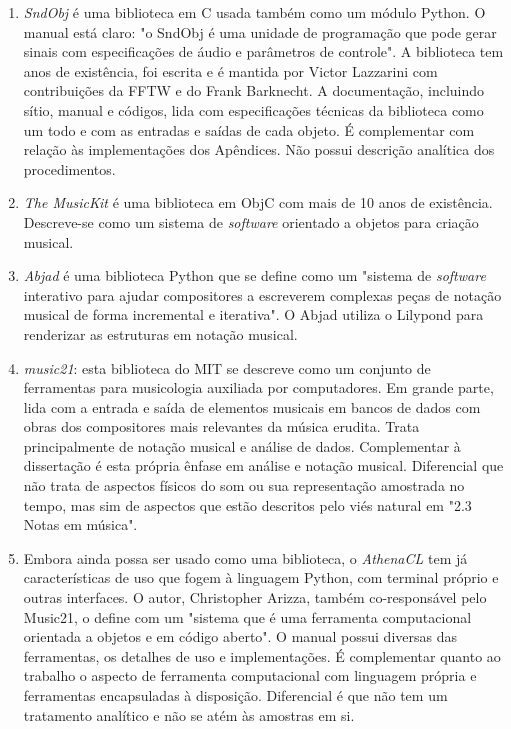 \begin{enumerate}
    \item \emph{SndObj} é uma biblioteca em C usada também como um módulo Python. O manual está claro: "o SndObj é uma unidade de programação que pode gerar sinais com especificações de áudio e parâmetros de controle". A biblioteca tem anos de existência, foi escrita e é mantida por Victor Lazzarini com contribuições da FFTW e do Frank Barknecht. A documentação, incluindo sítio, manual e códigos, lida com especificações técnicas da biblioteca como um todo e com as entradas e saídas de cada objeto. É complementar com relação às implementações dos Apêndices. Não possui descrição analítica dos procedimentos.
    \item \emph{The MusicKit} é uma biblioteca em ObjC com mais de 10 anos de existência. Descreve-se como um sistema de \emph{software} orientado a objetos para criação musical. 
    \item \emph{Abjad} é uma biblioteca Python que se define como um "sistema de \emph{software} interativo para ajudar compositores a escreverem complexas peças de notação musical de forma incremental e iterativa". O Abjad utiliza o Lilypond para renderizar as estruturas em notação musical.
    \item \emph{music21}: esta biblioteca do MIT se descreve como um conjunto de ferramentas para musicologia auxiliada por computadores. Em grande parte, lida com a entrada e saída de elementos musicais em bancos de dados com obras dos compositores mais relevantes da música erudita. Trata principalmente de notação musical e análise de dados. Complementar à dissertação é esta própria ênfase em análise e notação musical. Diferencial que não trata de aspectos físicos do som ou sua representação amostrada no tempo, mas sim de aspectos que estão descritos pelo viés natural em "2.3 Notas em música".
    \item Embora ainda possa ser usado como uma biblioteca, o \emph{AthenaCL} tem já características de uso que fogem à linguagem Python, com terminal próprio e outras interfaces. O autor, Christopher Arizza, também co-responsável pelo Music21, o define com um "sistema que é uma ferramenta computacional orientada a objetos e em código aberto". O manual possui diversas das ferramentas, os detalhes de uso e implementações. É complementar quanto ao trabalho o aspecto de ferramenta computacional com linguagem própria e ferramentas encapsuladas à disposição. Diferencial é que não tem um tratamento analítico e não se atém às amostras em si. 

\end{enumerate}
